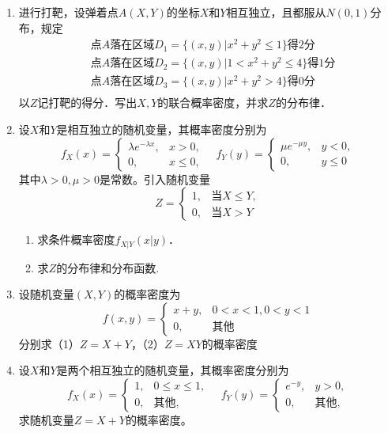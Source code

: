 \begin{enumerate}
     \item 进行打靶，设弹着点$A(X,Y)$的坐标$X$和$Y$相互独立，且都服从$N(0,1)$分布，规定
    \begin{equation}
        \begin{aligned}
        \nonumber
        &\text{点}A\mbox{落在区域}D_1=\{(x,y)|x^2+y^2\leq 1\}\mbox{得}2\mbox{分}\\
        &\mbox{点}A\mbox{落在区域}D_2=\{(x,y)|1<x^2+y^2\leq 4\}\mbox{得}1\mbox{分}\\
        &\mbox{点}A\mbox{落在区域}D_3=\{(x,y)|x^2+y^2>4\}\mbox{得}0\mbox{分}\\              
        \end{aligned}
    \end{equation}
    以$Z$记打靶的得分．写出$X,Y$的联合概率密度，并求$Z$的分布律．


    \item 设$X$和$Y$是相互独立的随机变量，其概率密度分别为
    $$f_X(x)=\left\{\begin{array}{ll}
        \lambda e^{-\lambda x}, & x>0,\\
        0, & x\leq 0,
    \end{array}\right.\quad
    f_Y(y)=\left\{\begin{array}{ll}
        \mu e^{-\mu y}, & y<0,\\
        0, & y\leq 0
    \end{array}\right.$$
    其中$\lambda>0,\mu>0$是常数。引入随机变量
    $$Z=\left\{\begin{array}{ll}
        1, & \mbox{当}X\leq Y,\\
        0, & \mbox{当}X>Y
    \end{array}\right.$$
    \begin{enumerate}
        \item 求条件概率密度$f_{X|Y}(x|y)$．
        \item 求$Z$的分布律和分布函数.
    \end{enumerate}
     


    \item 设随机变量$(X,Y)$的概率密度为
    $$f(x,y)=\left\{\begin{array}{ll}
        x+y, & 0<x<1,0<y<1\\
        0, & \mbox{其他}
    \end{array}\right.$$
    分别求（1）$Z=X+Y$，（2）$Z=XY$的概率密度


    \item 设$X$和$Y$是两个相互独立的随机变量，其概率密度分别为
    $$f_X(x)=\left\{\begin{array}{ll}
        1, & 0\leq x\leq 1,\\
        0, & \mbox{其他},
    \end{array}\right.\quad
    f_Y(y)=\left\{\begin{array}{ll}
        e^{-y}, & y>0,\\
        0, & \mbox{其他},
    \end{array}\right.$$
    求随机变量$Z=X+Y$的概率密度。


\end{enumerate}
